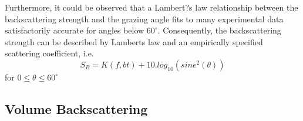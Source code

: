 \noindent Furthermore, it could be observed that a Lambert?s law relationship between the backscattering strength and the grazing angle fits to many experimental data satisfactorily accurate for angles below $60^{\circ}$. Consequently, the backscattering strength can be described by Lambert\textsc{}s law and an empirically specified scattering coefficient, i.e.
\[ {S_B}  = K ( \textit{f}, bt) + 10 . log_{10}( sine^{2}(\theta)) \] 
 for  $0 \leq \theta \leq 60^{\circ}$

\subsection{ Volume Backscattering } \label{ Volume Backscattering } 

\noindent 

